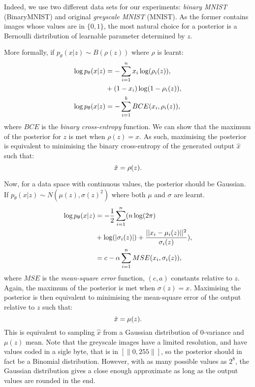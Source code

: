 \documentclass{article}
\begin{document}
Indeed, we use two different data sets for our experiments:
\emph{binary MNIST} (BinaryMNIST) and original \emph{greyscale MNIST} (MNIST).
As the former contains images whose values are in $\{0, 1\}$,
the most natural choice for a posterior is a Bernoulli distribution
of learnable parameter determined by $z$.

More formally, if $p_\theta(x|z) \sim B(\rho(z))$ where $\rho$ is learnt:
\begin{equation}
    \centering
    \begin{aligned}
        \log p_\theta(x|z) &= - \sum_{i=1}^{n} x_i \log(\rho_i(z)),
        \\
        &+ (1 - x_i)\log(1 - \rho_i(z)),
        \\
        \log p_\theta(x|z) &= - \sum_{i=1}^{b} BCE(x_i, \rho_i(z)),
    \end{aligned}
    \label{eq:vae_post_disc}
\end{equation}
where $BCE$ is the \emph{binary cross-entropy} function.
We can show that the maximum of the posterior for $z$
is met when $\rho(z)=x$.
As such, maximising the posterior is equivalent to minimising the binary cross-entropy
of the generated output $\hat{x}$ such that:
\begin{equation}
    \centering
    \hat{x} = \rho(z).
    \label{eq:vae_gen_disc}
\end{equation}

Now, for a data space with continuous values, the posterior should be Gaussian.
If $p_\theta(x|z) \sim N(\mu(z), \sigma(z)^2)$ where both $\mu$ and $\sigma$ are learnt.
\begin{equation}
    \centering
    \begin{aligned}
        \log p_\theta(x|z) &= -\frac{1}{2} \sum_{i=1}^{n} (n\log(2\pi)
        \\
        &+ \log(|\sigma_i(z)|) + \frac{||x_i - \mu_i(z)||^{2}}{\sigma_i(z)}),
        \\
        &= c - \alpha \sum_{i=1}^{n} MSE(x_i, \sigma_i(z)),
    \end{aligned}
    \label{eq:vae_post_cont}
\end{equation}
where $MSE$ is the \emph{mean-square error} function, $(c, a)$ constants relative to $z$.
Again, the maximum of the posterior is met when $\sigma(z)=x$.
Maximising the posterior is then equivalent to minimising the mean-square error of the output
relative to $z$ such that:
\begin{equation}
    \centering
    \hat{x} = \mu(z).
    \label{eq:vae_gen_cont}
\end{equation}
This is equivalent to sampling $\hat{x}$ from a Gaussian distribution of $0$-variance 
and $\mu(z)$ mean.
Note that the greyscale images have a limited resolution,
and have values coded in a sigle byte, that is in $[\|0, 255\|]$,
so the posterior should in fact be a Binomial distribution.
However, with as many possible values as $2^8$, the Gaussian
distribution gives a close enough approximate as long as the
output values are rounded in the end.
\end{document}
